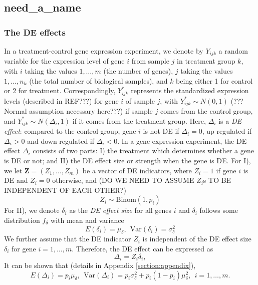 \documentclass[useAMS,usenatbib, galley]{biom}
\newcommand{\OurMethod}{need\_a\_name}
\begin{document}
	\subsection{\OurMethod}
	\subsubsection{The DE effects}\label{subsection:DEeffect}
	
	In a treatment-control gene expression experiment, we denote by $Y_{ijk}$ a random variable for the expression level of gene $i$ from sample $j$ in treatment group $k$, with $i$ taking the values $1, \ldots, m$ (the number of genes), $j$ taking the values $1, \ldots, n_k$ (the total number of biological samples), and $k$ being either 1 for control or 2 for treatment. Correspondingly, $Y^{\ast}_{ijk}$ represents the standardized expression levels (described in REF???) for gene $i$ of sample $j$, with $Y^{\ast}_{ijk}\sim N(0, 1)$ (??? Normal assumption necessary here???)  if sample $j$ comes from the control group, and $Y^{\ast}_{ijk}\sim N(\Delta_i, 1)$ if it comes from the treatment group. Here, $\Delta_i$ is a \textit{DE effect}: compared to the control group,  gene $i$ is not DE if $\Delta_i=0$, up-regulated if $\Delta_i >0 $ and down-regulated if $\Delta_i<0$.
	In a gene expression experiment, the DE effect $\Delta_i$ consists of two parts: I) the treatment which determines whether a gene is DE or not; and II) the DE effect size or strength when the gene is DE. 
	For I), we let $\bm Z = (Z_1, \ldots, Z_m)$ be a vector of DE indicators, where $Z_i=1$ if gene $i$ is DE and $Z_i = 0$ otherwise, and (DO WE NEED TO ASSUME $Z_i$s TO BE INDEPENDENT OF EACH OTHER?)
	\begin{equation}\label{eq:DEindicator}
	Z_i \sim \text{Binom}(1, p_i)
	\end{equation}
	For II), we denote $\delta_i$ as the \textit{DE effect size} for all genes $i$ and $\delta_i$ follows some distribution $ f_{\delta}$ with mean and variance
	\begin{equation}\label{eq:DEdistribution}
	E(\delta_i) = \mu_{\delta}, ~~\text{Var}(\delta_i) = \sigma^2_{\delta}
	\end{equation}
	We further assume that the DE indicator $Z_i$ is independent of the DE effect size $\delta_i$ for gene $i=1, \ldots, m$.  Therefore, the DE effect can be expressed as
	\begin{equation}\label{eq:DEeffect}
	\Delta_i = Z_i\delta_i,
	\end{equation}
	It can be shown that (details in Appendix \ref{section:appendix}), 
	\begin{equation}\label{eq:deltaMeanVar}
	E(\Delta_i) = p_i\mu_{\delta}, ~~  \text{Var}(\Delta_i)= p_i\sigma_{\delta}^2 + p_i(1-p_i)\mu_{\delta}^2, ~~i = 1, \ldots, m.
	\end{equation}
	
\end{document}
